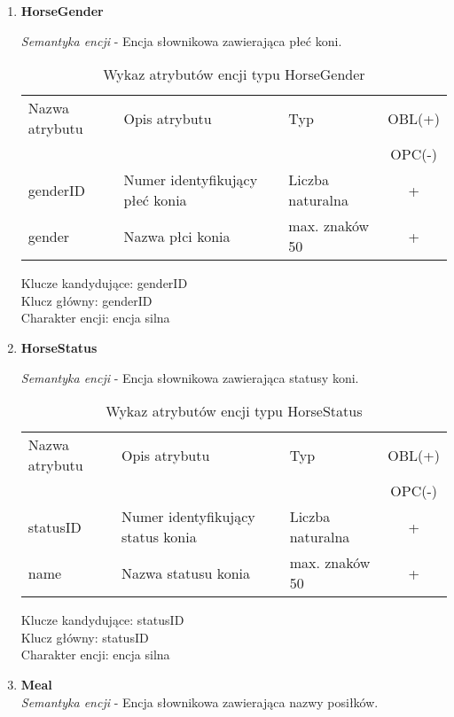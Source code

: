 \documentclass[12pt,twoside]{report}
\begin{document}
\begin{enumerate}[start=10,label={\bfseries ENC$\backslash$0\arabic*}]
	
	\item \textbf{HorseGender}
	
	\textit{Semantyka encji} - Encja słownikowa zawierająca płeć koni.
	
	\begin{table}[h!]
		\centering
		\begin{tabular}{|l|l|l|c|}
			\hline
			Nazwa atrybutu & Opis atrybutu & Typ & OBL(+) \\
			& & &  OPC(-) \\
			\hline
			genderID & Numer identyfikujący płeć konia & Liczba naturalna & + \\
			\hline
			gender &  Nazwa płci konia & max. znaków 50 & + \\
			\hline
		\end{tabular}
		\caption{Wykaz atrybutów encji typu HorseGender }
	\end{table}
	Klucze kandydujące: genderID \\
	Klucz główny: genderID \\
	Charakter encji: encja silna \\
	
	
	\item \textbf{HorseStatus}
	
	\textit{Semantyka encji} - Encja słownikowa zawierająca statusy koni.
	
	\begin{table}[h!]
		\centering
		\begin{tabular}{|l|l|l|c|}
			\hline
			Nazwa atrybutu & Opis atrybutu & Typ & OBL(+) \\
			& & &  OPC(-) \\
			\hline
			statusID & Numer identyfikujący status konia & Liczba naturalna & + \\
			\hline
			name &  Nazwa statusu konia & max. znaków 50 & + \\
			\hline
		\end{tabular}
		\caption{Wykaz atrybutów encji typu HorseStatus }
	\end{table}
	Klucze kandydujące: statusID \\
	Klucz główny: statusID \\
	Charakter encji: encja silna \\
	
	
	\item \textbf{Meal} \\
	\textit{Semantyka encji} - Encja słownikowa zawierająca nazwy posiłków.
	

\end{enumerate}
\end{document}
